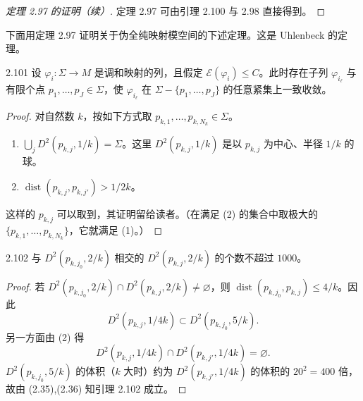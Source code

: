 \begin{proof}[定理 2.97 的证明（续）]
  定理 2.97 可由引理 2.100 与 2.98 直接得到。
\end{proof}

下面用定理 2.97 证明关于伪全纯映射模空间的下述定理。这是 Uhlenbeck 的定理。

\begin{theorem*}{2.101}
  设 $\varphi_i\colon\Sigma\to M$ 是调和映射的列，且假定 $\mathcal{E}(\varphi_i)\le C$。此时存在子列 $\varphi_{i_\ell}$ 与有限个点 $p_1,\dots,p_J\in\Sigma$，使 $\varphi_{i_\ell}$ 在 $\Sigma-\{p_1,\dots,p_J\}$ 的任意紧集上一致收敛。
\end{theorem*}

\begin{proof}
  对自然数 $k$，按如下方式取 $p_{k,1},\dots,p_{k,N_k}\in\Sigma$。
  \begin{enumerate}[label=（\arabic*）,leftmargin=2.4em]
    \item $\bigcup_jD^2(p_{k,j},1/k)=\Sigma$。这里 $D^2(p_{k,j},1/k)$ 是以 $p_{k,j}$ 为中心、半径 $1/k$ 的球。
    \item $\operatorname{dist}(p_{k,j},p_{k,j'})>1/2k$。
  \end{enumerate}
  这样的 $p_{k,j}$ 可以取到，其证明留给读者。（在满足 (2) 的集合中取极大的 $\{p_{k,1},\dots,p_{k,N_k}\}$，它就满足 (1)。）
\end{proof}

\begin{lemma*}{2.102}
  与 $D^2(p_{k,j_0},2/k)$ 相交的 $D^2(p_{k,j},2/k)$ 的个数不超过 $1000$。
\end{lemma*}

\begin{proof}
  若 $D^2(p_{k,j_0},2/k)\cap D^2(p_{k,j},2/k)\ne\varnothing$，则 $\operatorname{dist}(p_{k,j_0},p_{k,j})\le4/k$。因此
  \begin{equation}
    D^2(p_{k,j},1/4k)\subset D^2(p_{k,j_0},5/k). \tag{2.35}
  \end{equation}
  另一方面由 (2) 得
  \begin{equation}
    D^2(p_{k,j},1/4k)\cap D^2(p_{k,j'},1/4k)=\varnothing . \tag{2.36}
  \end{equation}
  $D^2(p_{k,j_0},5/k)$ 的体积（$k$ 大时）约为 $D^2(p_{k,j'},1/4k)$ 的体积的 $20^2=400$ 倍，故由 (2.35),(2.36) 知引理 2.102 成立。
\end{proof}

